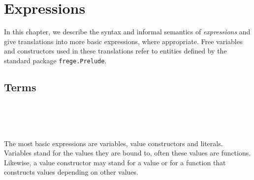 

\chapter{Expressions} \label{expressions} 

In this chapter, we describe the syntax and informal semantics of \frege{} \emph{expressions} and give translations into more basic expressions, where appropriate.
Free variables and constructors used in these translations refer to entities defined by the standard package \texttt{frege.Prelude}.


\section{Terms}  \label{termexp}

\begin{flushleft}
  
  \alt{}   
  \alt{}   \sym{\{}  \sym{\}} 
  \alt{} 
  \alt{} \regex{\_} 
  \alt{} \sym{(}  \sym{)}
  \alt{} \sym{(}  \sym{)}
  \alt{} 
  \alt{} \sym{(} \sym{)} 
  \alt{}  
  \alt{}   \\
 \\
  \\
\end{flushleft}

The most basic expressions are variables, value constructors and literals.
Variables stand for the values they are bound to, often these values are functions.
Likewise, a value constructor may stand for a value or for a function that constructs values depending on other values.

